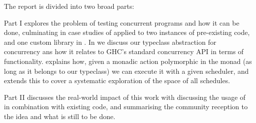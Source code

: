 
The report is divided into two broad parts:

Part I explores the problem of testing concurrent programs and how it
can be done, culminating in case studies of \dejafu{} applied to two
instances of pre-existing code, and one custom library in
. In  we discuss our typeclass
abstraction for concurrency ans how it relates to GHC's standard
concurrency API in terms of functionality.  explains
how, given a monadic action polymorphic in the monad (as long as it
belongs to our typeclass) we can execute it with a given scheduler,
and  extends this to cover a systematic exploration of the
space of all schedules.

Part II discusses the real-world impact of this work with
 discussing the usage of \dejafu{} in combination with
existing code, and  summarising the community
reception to the idea and what is still to be done.

